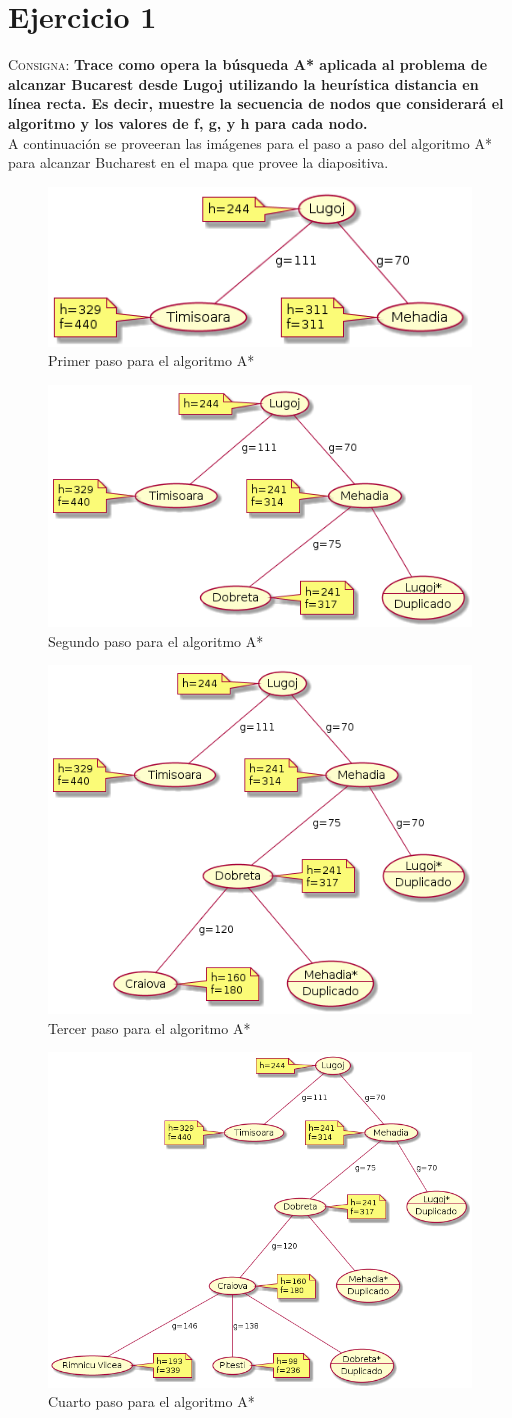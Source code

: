 \documentclass{article}
\begin{document}
\section{Ejercicio 1}
\label{sec:ej1}
\textsc{Consigna}: \textbf{Trace como opera la b\'usqueda A* aplicada al problema de alcanzar Bucarest desde Lugoj utilizando la heur\'istica distancia en l\'inea recta. Es decir, muestre la secuencia de nodos que considerará el algoritmo y los valores de f, g, y h para cada nodo.}\\

A continuaci\'on se proveeran las im\'agenes para el paso a paso del algoritmo A* para alcanzar Bucharest en el mapa que provee la diapositiva.

\begin{figure}[H]
  \centering
  \includegraphics[width=.4\linewidth]{EJ2/As.png}
  \caption{Primer paso para el algoritmo A*}
\end{figure}

\begin{figure}[H]
  \centering
  \includegraphics[width=.4\linewidth]{EJ2/As_001.png}
  \caption{Segundo paso para el algoritmo A*}
\end{figure}

\begin{figure}[H]
  \centering
  \includegraphics[width=.4\linewidth]{EJ2/As_002.png}
  \caption{Tercer paso para el algoritmo A*}
\end{figure}

\begin{figure}[H]
  \centering
  \includegraphics[width=.4\linewidth]{EJ2/As_003.png}
  \caption{Cuarto paso para el algoritmo A*}
\end{figure}
\end{document}
